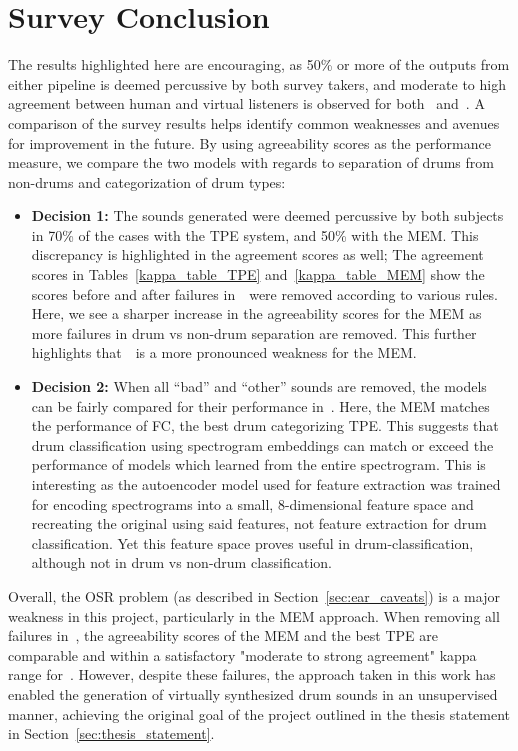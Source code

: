 \documentclass[\main/thesis.tex]{subfiles}
\begin{document}
\section{Survey Conclusion}
\label{survey-conc}
The results highlighted here are encouraging, as 50\% or more of the outputs from either pipeline is deemed percussive by both survey takers, and moderate to high agreement between human and virtual listeners is observed for both \decfirst~and~\decsecond. A comparison of the survey results helps identify common weaknesses and avenues for improvement in the future. By using agreeability scores as the performance measure, we compare the two models with regards to separation of drums from non-drums and categorization of drum types:
\begin{itemize}
\item \textbf{Decision 1:} The sounds generated were deemed percussive by both subjects in 70\% of the cases with the TPE system, and 50\% with the MEM. This discrepancy is highlighted  in the agreement scores as well; The agreement scores in Tables~\ref{kappa_table_TPE} and~\ref{kappa_table_MEM} show the scores before and after failures in~\decfirst~were removed according to various rules. Here, we see a sharper increase in the agreeability scores for the MEM as more failures in drum vs non-drum separation are removed. This further highlights that~\decfirst~is a more pronounced weakness for the MEM.
\item \textbf{Decision 2:} When all \enquote{bad} and \enquote{other} sounds are removed, the models can be fairly compared for their performance in~\decsecond. Here, the MEM matches the performance of FC, the best drum categorizing TPE. This suggests that drum classification using spectrogram embeddings can match or exceed the performance of models which learned from the entire spectrogram. This is interesting as the autoencoder model used for feature extraction was trained for encoding spectrograms into a small, 8-dimensional feature space and recreating the original using said features, not feature extraction for drum classification. Yet this feature space proves useful in drum-classification, although not in drum vs non-drum classification.  
\end{itemize}

Overall, the OSR problem (as described in Section~\ref{sec:ear_caveats}) is a major weakness in this project, particularly in the MEM approach. When removing all failures in~\decfirst, the agreeability scores of the MEM and the best TPE are comparable and within a satisfactory "moderate to strong agreement" kappa range for~\decsecond. However, despite these failures, the approach taken in this work has enabled the generation of virtually synthesized drum sounds in an unsupervised manner, achieving the original goal of the project outlined in the thesis statement in Section~\ref{sec:thesis_statement}. 




\end{document}
